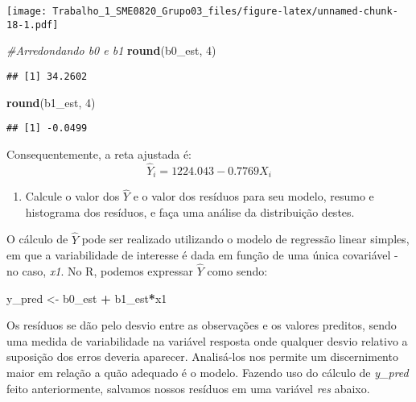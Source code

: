 \documentclass[
]{article}
\newenvironment{Shaded}{\begin{snugshade}}{\end{snugshade}}
\newcommand{\CommentTok}[1]{\textcolor[rgb]{0.56,0.35,0.01}{\textit{#1}}}
\newcommand{\DecValTok}[1]{\textcolor[rgb]{0.00,0.00,0.81}{#1}}
\newcommand{\KeywordTok}[1]{\textcolor[rgb]{0.13,0.29,0.53}{\textbf{#1}}}
\newcommand{\NormalTok}[1]{#1}
\newcommand{\OperatorTok}[1]{\textcolor[rgb]{0.81,0.36,0.00}{\textbf{#1}}}
\newcommand{\StringTok}[1]{\textcolor[rgb]{0.31,0.60,0.02}{#1}}
\providecommand{\tightlist}{%
  \setlength{\itemsep}{0pt}\setlength{\parskip}{0pt}}
\begin{document}
\texttt{[image: Trabalho\_1\_SME0820\_Grupo03\_files/figure-latex/unnamed-chunk-18-1.pdf]}

\begin{Shaded}
\begin{Highlighting}[]
\CommentTok{#Arredondando b0 e b1}
\KeywordTok{round}\NormalTok{(b0_est, }\DecValTok{4}\NormalTok{)}
\end{Highlighting}
\end{Shaded}

\begin{verbatim}
## [1] 34.2602
\end{verbatim}

\begin{Shaded}
\begin{Highlighting}[]
\KeywordTok{round}\NormalTok{(b1_est, }\DecValTok{4}\NormalTok{)}
\end{Highlighting}
\end{Shaded}

\begin{verbatim}
## [1] -0.0499
\end{verbatim}

Consequentemente, a reta ajustada é:
\[\widehat{Y}_i=1224.043-0.7769X_i\]

\begin{enumerate}
\def\labelenumi{\arabic{enumi}.}
\setcounter{enumi}{2}
\tightlist
\item
  Calcule o valor dos \(\hat{Y}\) e o valor dos resíduos para seu
  modelo, resumo e histograma dos resíduos, e faça uma análise da
  distribuição destes.
\end{enumerate}

O cálculo de \(\hat{Y}\) pode ser realizado utilizando o modelo de
regressão linear simples, em que a variabilidade de interesse é dada em
função de uma única covariável - no caso, \emph{x1}. No R, podemos
expressar \(\hat{Y}\) como sendo:

\begin{Shaded}
\begin{Highlighting}[]
\NormalTok{y_pred <-}\StringTok{  }\NormalTok{b0_est }\OperatorTok{+}\StringTok{ }\NormalTok{b1_est}\OperatorTok{*}\NormalTok{x1}
\end{Highlighting}
\end{Shaded}

Os resíduos se dão pelo desvio entre as observações e os valores
preditos, sendo uma medida de variabilidade na variável resposta onde
qualquer desvio relativo a suposição dos erros deveria aparecer.
Analisá-los nos permite um discernimento maior em relação a quão
adequado é o modelo. Fazendo uso do cálculo de \emph{y\_pred} feito
anteriormente, salvamos nossos resíduos em uma variável \emph{res}
abaixo.
\end{document}
